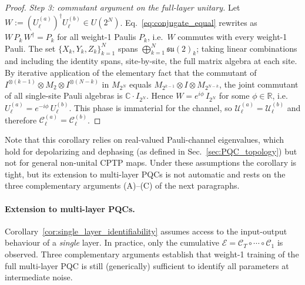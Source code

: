 \documentclass[%
 reprint,
superscriptaddress,
 amsmath,amssymb,
 aps,
]{revtex4-2}
\newcommand{\E}{\mathcal{E}}
\begin{document}
\begin{proof}
\emph{Step 3: commutant argument on the full-layer unitary.} Let $W := (U_\ell^{(a)})^{\dagger} U_\ell^{(b)} \in U(2^N)$. Eq.~\eqref{eq:conjugate_equal} rewrites as $W\,P_k\,W^{\dagger} = P_k$ for all weight-1 Paulis $P_k$, i.e.\ $W$ commutes with every weight-1 Pauli. The set $\{X_k,Y_k,Z_k\}_{k=1}^{N}$ spans $\bigoplus_{k=1}^{N}\mathfrak{su}(2)_k$; taking linear combinations and including the identity spans, site-by-site, the full matrix algebra at each site. By iterative application of the elementary fact that the commutant of $I^{\otimes (k-1)}\otimes M_2 \otimes I^{\otimes(N-k)}$ in $M_{2^N}$ equals $M_{2^{k-1}}\otimes I \otimes M_{2^{N-k}}$, the joint commutant of all single-site Pauli algebras is $\mathbb{C}\cdot I_{2^N}$. Hence $W = e^{i\phi}\,I_{2^N}$ for some $\phi\in\mathbb{R}$, i.e.\ $U_\ell^{(a)} = e^{-i\phi}\,U_\ell^{(b)}$. This phase is immaterial for the channel, so $\mathcal{U}_\ell^{(a)}=\mathcal{U}_\ell^{(b)}$ and therefore $\mathcal{C}_\ell^{(a)}=\mathcal{C}_\ell^{(b)}$.
\end{proof}

Note that this corollary relies on real-valued Pauli-channel eigenvalues, which hold for depolarizing and dephasing (as defined in Sec.~\ref{sec:PQC_topology}) but not for general non-unital CPTP maps. Under these assumptions the corollary is tight, but its extension to multi-layer PQCs is not automatic and rests on the three complementary arguments (A)--(C) of the next paragraphs.

\paragraph*{Extension to multi-layer PQCs.}
Corollary~\ref{cor:single_layer_identifiability} assumes access to the input-output behaviour of a \emph{single} layer. In practice, only the cumulative $\E = \mathcal{C}_T\circ\cdots\circ\mathcal{C}_1$ is observed. Three complementary arguments establish that weight-1 training of the full multi-layer PQC is still (generically) sufficient to identify all parameters at intermediate noise.
\end{document}
